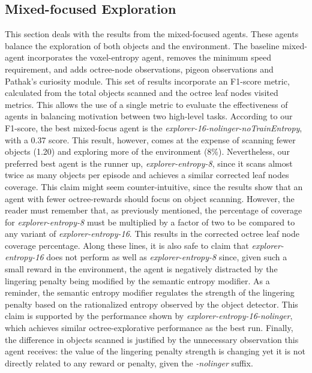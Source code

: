     \subsection{Mixed-focused Exploration} \label{chap5:mixed-focused}
        This section deals with the results from the mixed-focused agents. These agents balance the exploration of both objects and the environment. The baseline mixed-agent incorporates the voxel-entropy agent, removes the minimum speed requirement, and adds octree-node observations, pigeon observations and Pathak's curiosity module. 
        This set of results incorporate an F1-score metric, calculated from the total objects scanned and the octree leaf nodes visited metrics. 
        This allows the use of a single metric to evaluate the effectiveness of agents in balancing motivation between two high-level tasks.
        According to our F1-score, the best mixed-focus agent is the \textit{explorer-16-nolinger-noTrainEntropy}, with a 0.37 score. This result, however, comes at the expense of scanning fewer objects (1.20) and exploring more of the environment (8\%). Nevertheless, our preferred best agent is the runner up, \textit{explorer-entropy-8}, since it scans almost twice as many objects per episode and achieves a similar corrected leaf nodes coverage. This claim might seem counter-intuitive, since the results show that an agent with fewer octree-rewards should focus on object scanning. However, the reader must remember that, as previously mentioned, the percentage of coverage for \textit{explorer-entropy-8} must be multiplied by a factor of two to be compared to any variant of \textit{explorer-entropy-16}. This results in the corrected octree leaf node coverage percentage. 
        Along these lines, it is also safe to claim that \textit{explorer-entropy-16} does not perform as well as \textit{explorer-entropy-8} since, given such a small reward in the environment, the agent is negatively distracted by the lingering penalty being modified by the semantic entropy modifier. As a reminder, the semantic entropy modifier regulates the strength of the lingering penalty based on the rationalized entropy observed by the object detector. This claim is supported by the performance shown by \textit{explorer-entropy-16-nolinger}, which achieves similar octree-explorative performance as the best run. Finally, the difference in objects scanned is justified by the unnecessary observation this agent receives: the value of the lingering penalty strength is changing yet it is not directly related to any reward or penalty, given the \textit{-nolinger} suffix.
        
